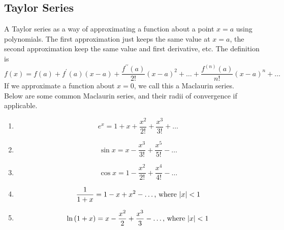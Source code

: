 \subsection{Taylor Series}
\noindent
A Taylor series as a way of approximating a function about a point $x=a$ using polynomials. The first approximation just keeps the same value at $x=a$, the second approximation keep the same value and first derivative, etc. The definition is
\begin{equation*}
	f(x) = f(a)+f^\prime(a)(x-a) + \frac{f^{\prime\prime}(a)}{2!}(x-a)^2 + \ldots +  \frac{f^{(n)}(a)}{n!}(x-a)^n + \ldots
\end{equation*}
If we approximate a function about $x=0$, we call this a Maclaurin series.\\

\noindent
Below are some common Maclaurin series, and their radii of convergence if applicable.
\begin{enumerate}[label=]
	\item \begin{equation*}
		e^x = 1 + x + \frac{x^2}{2!} + \frac{x^3}{3!} + \ldots
	\end{equation*}
	\item \begin{equation*}
		\sin{x} = x - \frac{x^3}{3!} + \frac{x^5}{5!} - \ldots
	\end{equation*}
	\item \begin{equation*}
		\cos{x} = 1 - \frac{x^2}{2!} + \frac{x^4}{4!} - \ldots
	\end{equation*}
	\item \begin{equation*}
		\frac{1}{1+x} = 1 - x + x^2 - \ldots \text{, where } \lvert x \rvert < 1
	\end{equation*}
	\item \begin{equation*}
		\ln{(1+x)} = x - \frac{x^2}{2} + \frac{x^3}{3} - \ldots \text{, where } \lvert x \rvert < 1
	\end{equation*}
\end{enumerate}

